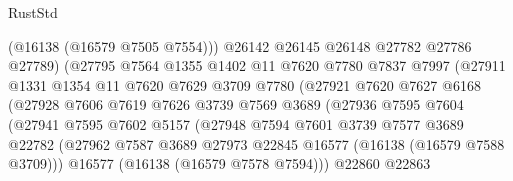 \begin{lexlean}{RustStd}
\begin{coremodule}
                                (@16138 (@16579 @7505 @7554)))
                              @26142
                              @26145
                              @26148
                              @27782
                              @27786
                              @27789)
                            (@27795
                              @7564
                              @1355
                              @1402
                              @11
                              @7620
                              @7780
                              @7837
                              @7997
                              (@27911
                                @1331
                                @1354
                                @11
                                @7620
                                @7629
                                @3709
                                @7780
                                (@27921
                                  @7620
                                  @7627
                                  @6168
                                  (@27928
                                    @7606
                                    @7619
                                    @7626
                                    @3739
                                    @7569
                                    @3689
                                    (@27936
                                      @7595
                                      @7604
                                      (@27941
                                        @7595
                                        @7602
                                        @5157
                                        (@27948
                                          @7594
                                          @7601
                                          @3739
                                          @7577
                                          @3689
                                          @22782
                                          (@27962
                                            @7587
                                            @3689
                                            @27973
                                            @22845
                                            @16577
                                            (@16138 (@16579 @7588 @3709)))
                                          @16577
                                          (@16138 (@16579 @7578 @7594)))
                                        @22860
                                        @22863

\end{coremodule}
\end{lexlean}
